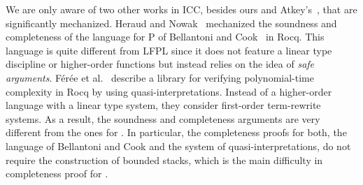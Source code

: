 We are only aware of two other works in ICC, besides ours and
Atkey's~\cite{atkeyPolynomialTimeDependent2024}, that are
significantly mechanized.
%
Heraud and Nowak~\cite{Heraud2011} mechanized the soundness and
completeness of the language for P of Bellantoni and
Cook~\cite{Bellantoni92} in Rocq.
%
This language is quite different from LFPL since it does not feature a
linear type discipline or higher-order functions but instead relies on
the idea of \emph{safe arguments}.
%
Férée et al.~\cite{Feree2018} describe a library for verifying
polynomial-time complexity in Rocq by using
quasi-interpretations. Instead of a higher-order language with a
linear type system, they consider first-order term-rewrite systems. As
a result, the soundness and completeness arguments are very different
from the ones for \lfpl.
%
In particular, the completeness proofs for both, the language of
Bellantoni and Cook and the system of quasi-interpretations, do not
require the construction of bounded stacks, which is the main
difficulty in completeness proof for \lfpl.
